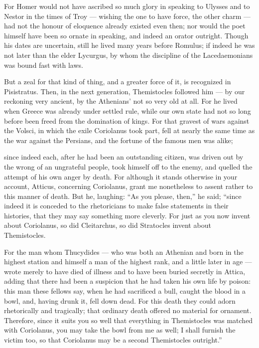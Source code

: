  For Homer would not have ascribed so much glory in speaking to Ulysses and to Nestor in the times of Troy — wishing the one to have force, the other charm — had not the honour of eloquence already existed even then; nor would the poet himself have been so ornate in speaking, and indeed an orator outright. Though his dates are uncertain, still he lived many years before Romulus; if indeed he was not later than the elder Lycurgus, by whom the discipline of the Lacedaemonians was bound fast with laws.

 But a zeal for that kind of thing, and a greater force of it, is recognized in Pisistratus. Then, in the next generation, Themistocles followed him — by our reckoning very ancient, by the Athenians' not so very old at all. For he lived when Greece was already under settled rule, while our own state had not so long before been freed from the domination of kings. For that gravest of wars against the Volsci, in which the exile Coriolanus took part, fell at nearly the same time as the war against the Persians, and the fortune of the famous men was alike;

 since indeed each, after he had been an outstanding citizen, was driven out by the wrong of an ungrateful people, took himself off to the enemy, and quelled the attempt of his own anger by death. For although it stands otherwise in your account, Atticus, concerning Coriolanus, grant me nonetheless to assent rather to this manner of death. But he, laughing: ``As you please, then,'' he said; ``since indeed it is conceded to the rhetoricians to make false statements in their histories, that they may say something more cleverly. For just as you now invent about Coriolanus, so did Cleitarchus, so did Stratocles invent about Themistocles.

 For the man whom Thucydides — who was both an Athenian and born in the highest station and himself a man of the highest rank, and a little later in age — wrote merely to have died of illness and to have been buried secretly in Attica, adding that there had been a suspicion that he had taken his own life by poison: this man these fellows say, when he had sacrificed a bull, caught the blood in a bowl, and, having drunk it, fell down dead. For this death they could adorn rhetorically and tragically; that ordinary death offered no material for ornament. Therefore, since it suits you so well that everything in Themistocles was matched with Coriolanus, you may take the bowl from me as well; I shall furnish the victim too, so that Coriolanus may be a second Themistocles outright.''

